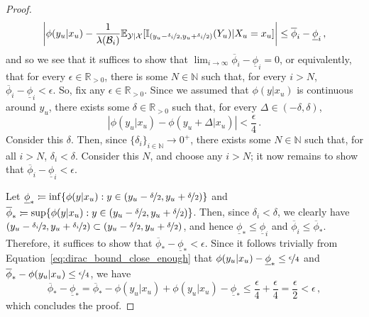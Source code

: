 \documentclass[twoside,11pt]{article}
\newcommand{\nats}{\mathbb{N}}
\newcommand{\reals}{\mathbb{R}}
\newcommand{\realspos}{\reals_{>0}}
\newcommand{\states}{\mathcal{X}}
\newcommand{\observs}{\mathcal{Y}}
\newcommand{\ind}[1]{\mathbb{I}_{#1}}
\newcommand{\abs}[1]{\left\vert #1 \right\vert}
\newcommand{\coloneqq}{:\!=}
\begin{document}
\begin{proof}
\begin{equation*}
\abs{\phi(y_u\vert x_u) - \frac{1}{\lambda(\mathcal{B}_i)}\mathbb{E}_{\observs\vert\states}[\ind{(y_u-\nicefrac{\delta_i}{2},y_u+\nicefrac{\delta_i}{2})}(Y_u)\vert X_u=x_u]} \leq \overline{\phi}_i - \underline{\phi}_i\,,
\end{equation*}
and so we see that it suffices to show that $\lim_{i\to\infty}\overline{\phi}_i - \underline{\phi}_i = 0$, or equivalently, that for every $\epsilon\in\realspos$, there is some $N\in\nats$ such that, for every $i>N$, $\overline{\phi}_i-\underline{\phi}_i < \epsilon$. So, fix any $\epsilon\in\realspos$. Since we assumed that $\phi(y\vert x_u)$ is continuous around $y_u$, there exists some $\delta\in\realspos$ such that, for every $\Delta\in(-\delta,\delta)$,
\begin{equation}\label{eq:dirac_bound_close_enough}
\abs{\phi(y_u\vert x_u) - \phi(y_u+\Delta\vert x_u)} < \frac{\epsilon}{4}\,.
\end{equation}
Consider this $\delta$. Then, since $\{\delta_i\}_{i\in\nats}\to 0^+$, there exists some $N\in\nats$ such that, for all $i>N$, $\delta_i < \delta$. Consider this $N$, and choose any $i>N$; it now remains to show that $\overline{\phi}_i-\underline{\phi}_i < \epsilon$.

Let $\underline{\phi}_*\coloneqq \inf\{ \phi(y\vert x_u):y\in(y_u-\nicefrac{\delta}{2},y_u+\nicefrac{\delta}{2}) \}$ and $\overline{\phi}_*\coloneqq \sup\{ \phi(y\vert x_u):y\in(y_u-\nicefrac{\delta}{2},y_u+\nicefrac{\delta}{2}) \}$. Then, since $\delta_i<\delta$, we clearly have $(y_u-\nicefrac{\delta_i}{2},y_u+\nicefrac{\delta_i}{2})\subset (y_u-\nicefrac{\delta}{2},y_u+\nicefrac{\delta}{2})$, and hence $\underline{\phi}_* \leq \underline{\phi}_i$ and $\overline{\phi}_i\leq \overline{\phi}_*$. Therefore, it suffices to show that $\overline{\phi}_*-\underline{\phi}_* < \epsilon$. Since it follows trivially from Equation~\eqref{eq:dirac_bound_close_enough} that $\phi(y_u\vert x_u)-\underline{\phi}_*\leq\nicefrac{\epsilon}{4}$ and $\overline{\phi}_*-\phi(y_u\vert x_u)\leq\nicefrac{\epsilon}{4}$, we have
\begin{equation*}
\overline{\phi}_* - \underline{\phi}_* = \overline{\phi}_* - \phi(y_u\vert x_u) + \phi(y_u\vert x_u) - \underline{\phi}_* \leq \frac{\epsilon}{4}+\frac{\epsilon}{4} = \frac{\epsilon}{2} < \epsilon\,,
\end{equation*}
which concludes the proof.
\end{proof}
\end{document}
